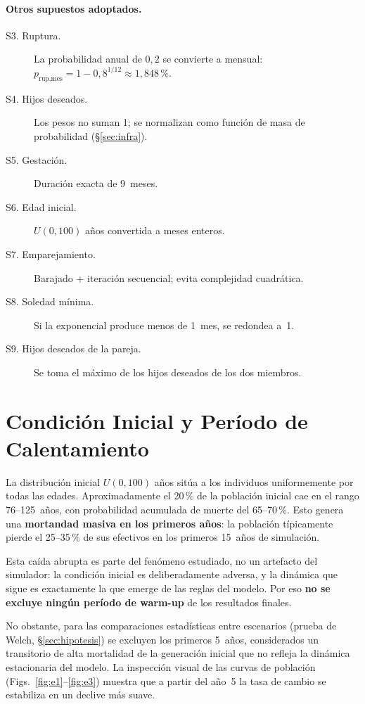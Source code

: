 \documentclass{llncs}
\begin{document}
\paragraph{Otros supuestos adoptados.}
\begin{description}
  \item[S3. Ruptura.]
        La probabilidad anual de $0{,}2$ se convierte a mensual:
        $p_{\text{rup,mes}} = 1 - 0{,}8^{1/12} \approx 1{,}848\,\%$.
  \item[S4. Hijos deseados.]
        Los pesos no suman 1; se normalizan como función de masa de
        probabilidad (\S\ref{sec:infra}).
  \item[S5. Gestación.]
        Duración exacta de 9~meses.
  \item[S6. Edad inicial.]
        $U(0, 100)$ años convertida a meses enteros.
  \item[S7. Emparejamiento.]
        Barajado + iteración secuencial; evita complejidad cuadrática.
  \item[S8. Soledad mínima.]
        Si la exponencial produce menos de 1~mes, se redondea a~1.
  \item[S9. Hijos deseados de la pareja.]
        Se toma el máximo de los hijos deseados de los dos miembros.
\end{description}

\section{Condición Inicial y Período de Calentamiento}
\label{sec:warmup}

La distribución inicial $U(0, 100)$ años sitúa a los individuos
uniformemente por todas las edades.
Aproximadamente el 20\,\% de la población inicial cae en el rango 76--125~años,
con probabilidad acumulada de muerte del 65--70\,\%.
Esto genera una \textbf{mortandad masiva en los primeros años}: la
población típicamente pierde el 25--35\,\% de sus efectivos en los
primeros 15~años de simulación.

Esta caída abrupta es parte del fenómeno estudiado, no un artefacto del
simulador: la condición inicial es deliberadamente adversa, y la dinámica
que sigue es exactamente la que emerge de las reglas del modelo.
Por eso \textbf{no se excluye ningún período de warm-up} de los resultados
finales.

No obstante, para las comparaciones estadísticas entre escenarios (prueba
de Welch, \S\ref{sec:hipotesis}) se excluyen los primeros 5~años,
considerados un transitorio de alta mortalidad de la generación inicial
que no refleja la dinámica estacionaria del modelo.
La inspección visual de las curvas de población
(Figs.~\ref{fig:e1}--\ref{fig:e3}) muestra que a partir del año~5 la tasa
de cambio se estabiliza en un declive más suave.
\end{document}

